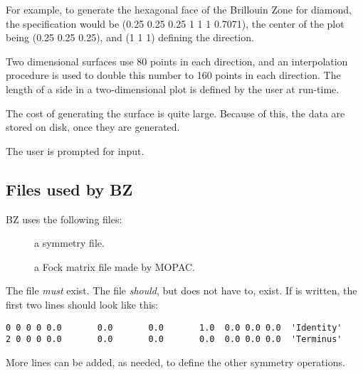 For example, to generate the hexagonal face of the Brillouin Zone for diamond,
the specification would be (0.25 0.25 0.25 1 1 1 0.7071), the center of the
plot being (0.25 0.25 0.25), and (1 1 1) defining the direction.

Two dimensional surfaces use 80 points in each direction, and an interpolation
procedure is used to double this number to 160 points in each direction.  The
length of a side in a two-dimensional plot is defined by the user at
run-time.

The cost of generating the surface is quite large.  Because of this, the data
are stored on disk, once they are generated.

The user is prompted for input.

\subsection{Files used by BZ}
BZ uses the following files:
\begin{description}
\item[] a symmetry file.
\item[] a Fock matrix file made by MOPAC.
\end{description}

The file  {\em must} exist.  The file
{\em should}, but does not have to, exist.    If  is
written,  the first two lines should look like this:
\begin{verbatim}
0 0 0 0 0.0       0.0       0.0       1.0  0.0 0.0 0.0  'Identity'
2 0 0 0 0.0       0.0       0.0       0.0  0.0 0.0 0.0  'Terminus'
\end{verbatim}
More lines can be added, as needed,  to define the other symmetry operations.
